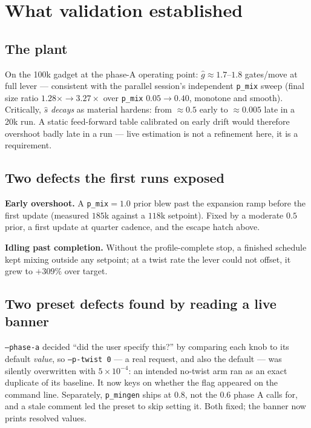 \documentclass[11pt]{article}
\newcommand{\code}[1]{\texttt{#1}}
\begin{document}
\section{What validation established}

\subsection{The plant}

On the 100k gadget at the phase-A operating point: $\hat g \approx 1.7$--$1.8$
gates/move at full lever --- consistent with the parallel session's
independent \code{p\_mix} sweep (final size ratio $1.28\times \to 3.27\times$
over \code{p\_mix} $0.05 \to 0.40$, monotone and smooth). Critically,
$\hat s$ \emph{decays} as material hardens: from $\approx 0.5$ early to
$\approx 0.005$ late in a 20k run. A static feed-forward table calibrated on
early drift would therefore overshoot badly late in a run --- live
estimation is not a refinement here, it is a requirement.

\subsection{Two defects the first runs exposed}

\textbf{Early overshoot.} A \code{p\_mix}$=1.0$ prior blew past the
expansion ramp before the first update (measured $185$k against a $118$k
setpoint). Fixed by a moderate $0.5$ prior, a first update at quarter
cadence, and the escape hatch above.

\textbf{Idling past completion.} Without the profile-complete stop, a
finished schedule kept mixing outside any setpoint; at a twist rate the
lever could not offset, it grew to $+309\%$ over target.

\subsection{Two preset defects found by reading a live banner}

\code{--phase-a} decided ``did the user specify this?'' by comparing each
knob to its default \emph{value}, so \code{--p-twist 0} --- a real request,
and also the default --- was silently overwritten with $5\times10^{-4}$: an
intended no-twist arm ran as an exact duplicate of its baseline. It now
keys on whether the flag appeared on the command line. Separately,
\code{p\_mingen} ships at $0.8$, not the $0.6$ phase A calls for, and a
stale comment led the preset to skip setting it. Both fixed; the banner now
prints resolved values.
\end{document}
